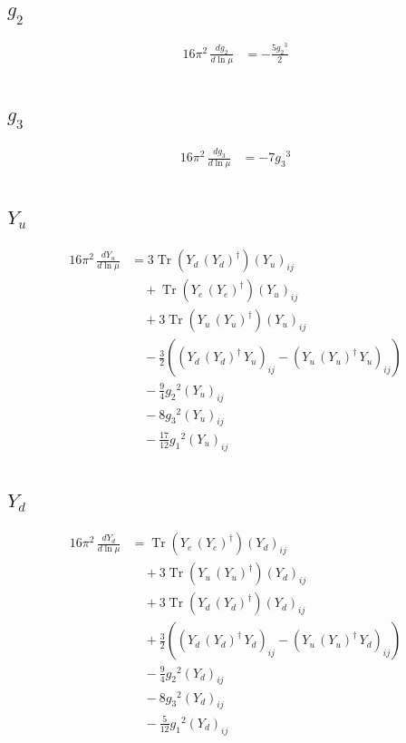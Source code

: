 \documentclass[10pt,a4paper]{article}
\begin{document}
\subsection*{$g_2$}
\begin{align*}
16\pi^2\,\frac{d g_2}{d\ln\mu} &=-\frac{5 {g_2}^3}{2} \\
\end{align*}
\subsection*{$g_3$}
\begin{align*}
16\pi^2\,\frac{d g_3}{d\ln\mu} &=-7 {g_3}^3 \\
\end{align*}
\subsection*{$Y_u$}
\begin{align*}
16\pi^2\,\frac{d Y_u}{d\ln\mu} &=3 \operatorname{Tr}\!\left({Y_d}\,\left({Y_d}\right)^{\dagger}\right) \left({Y_u}\right)_{ij} \\
&\quad +\operatorname{Tr}\!\left({Y_e}\,\left({Y_e}\right)^{\dagger}\right) \left({Y_u}\right)_{ij} \\
&\quad +3 \operatorname{Tr}\!\left({Y_u}\,\left({Y_u}\right)^{\dagger}\right) \left({Y_u}\right)_{ij} \\
&\quad -\frac{3}{2} (\left({Y_d}\,\left({Y_d}\right)^{\dagger}\,{Y_u}\right)_{ij}-\left({Y_u}\,\left({Y_u}\right)^{\dagger}\,{Y_u}\right)_{ij}) \\
&\quad -\frac{9}{4} {g_2}^2 \left({Y_u}\right)_{ij} \\
&\quad -8 {g_3}^2 \left({Y_u}\right)_{ij} \\
&\quad -\frac{17}{12} {g_1}^2 \left({Y_u}\right)_{ij} \\
\end{align*}
\subsection*{$Y_d$}
\begin{align*}
16\pi^2\,\frac{d Y_d}{d\ln\mu} &=\operatorname{Tr}\!\left({Y_e}\,\left({Y_e}\right)^{\dagger}\right) \left({Y_d}\right)_{ij} \\
&\quad +3 \operatorname{Tr}\!\left({Y_u}\,\left({Y_u}\right)^{\dagger}\right) \left({Y_d}\right)_{ij} \\
&\quad +3 \operatorname{Tr}\!\left({Y_d}\,\left({Y_d}\right)^{\dagger}\right) \left({Y_d}\right)_{ij} \\
&\quad +\frac{3}{2} (\left({Y_d}\,\left({Y_d}\right)^{\dagger}\,{Y_d}\right)_{ij}-\left({Y_u}\,\left({Y_u}\right)^{\dagger}\,{Y_d}\right)_{ij}) \\
&\quad -\frac{9}{4} {g_2}^2 \left({Y_d}\right)_{ij} \\
&\quad -8 {g_3}^2 \left({Y_d}\right)_{ij} \\
&\quad -\frac{5}{12} {g_1}^2 \left({Y_d}\right)_{ij} \\
\end{align*}
\end{document}
